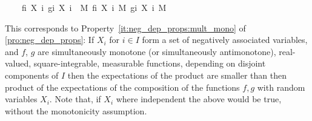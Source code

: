\begin{isabelle_cm}
\ \ \ {\isacartoucheopen}{\isacharparenleft}{\kern0pt}{\isasymintegral}{\kern0pt}{\isasymomega}{\isachardot}{\kern0pt}\ f{\isacharparenleft}{\kern0pt}{\isasymlambda}i{\isachardot}{\kern0pt}\ X\ i\ {\isasymomega}{\isacharparenright}{\kern0pt}{\isacharasterisk}{\kern0pt}g{\isacharparenleft}{\kern0pt}{\isasymlambda}i{\isachardot}{\kern0pt}\ X\ i\ {\isasymomega}{\isacharparenright}{\kern0pt}\ {\isasympartial}M{\isacharparenright}{\kern0pt}{\isasymle}{\isacharparenleft}{\kern0pt}{\isasymintegral}\isasymomega{\isachardot}{\kern0pt}\ f{\isacharparenleft}{\kern0pt}{\isasymlambda}i{\isachardot}{\kern0pt}\ X\ i\ \isasymomega{\isacharparenright}{\kern0pt}{\isasympartial}M{\isacharparenright}{\kern0pt}{\isacharasterisk}{\kern0pt}{\isacharparenleft}{\kern0pt}{\isasymintegral}{\kern0pt}\isasymomega{\isachardot}{\kern0pt}\ g{\isacharparenleft}{\kern0pt}{\isasymlambda}i{\isachardot}{\kern0pt}\ X\ i\ \isasymomega{\isacharparenright}{\kern0pt}{\isasympartial}M{\isacharparenright}{\kern0pt}{\isacartoucheclose}
\end{isabelle_cm}
This corresponds to Property~\ref{it:neg_dep_props:mult_mono} of \cref{pro:neg_dep_props}:
If $X_i$ for $i \in I$ form a set of negatively associated variables, and $f$, $g$ are simultaneously monotone (or simultaneously antimonotone), real-valued, square-integrable, measurable functions, depending on disjoint components of $I$ then the expectations of the product are smaller than then product of the expectations of the composition of the functions $f,g$ with random variables $X_i$.
Note that, if $X_i$ where independent the above would be true, without the monotonicity assumption.

